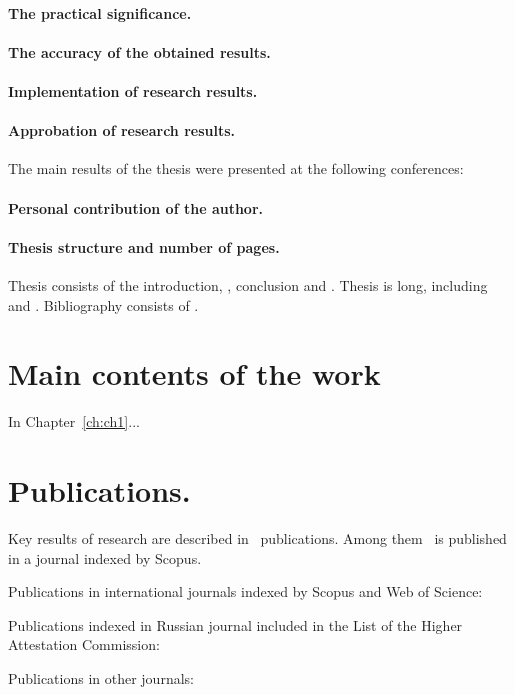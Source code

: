 \paragraph*{The practical significance.}
\paragraph*{The accuracy of the obtained results.}

\paragraph*{Implementation of research results.}
\paragraph*{Approbation of research results.}
The main results of the thesis were presented at the following conferences:
\printConferenceEN

\paragraph*{Personal contribution of the author.}
\paragraph*{Thesis structure and number of pages.}

Thesis consists of the introduction,
,
conclusion and 
.
Thesis is 
 long, including
 and
.
Bibliography consists of
.


\newpage
\section*{Main contents of the work}

In Chapter~\ref{ch:ch1}...

\section*{Publications.}

Key results of research are described in \theAllMyPapers~publications. 
Among them
\theScopusPapers~is published in a journal indexed by Scopus. 



Publications in international journals indexed by Scopus and Web of Science:
\printPapperScopus

Publications indexed in Russian journal included in the List of the Higher Attestation Commission: 

Publications in other journals:
\printPapperOther
